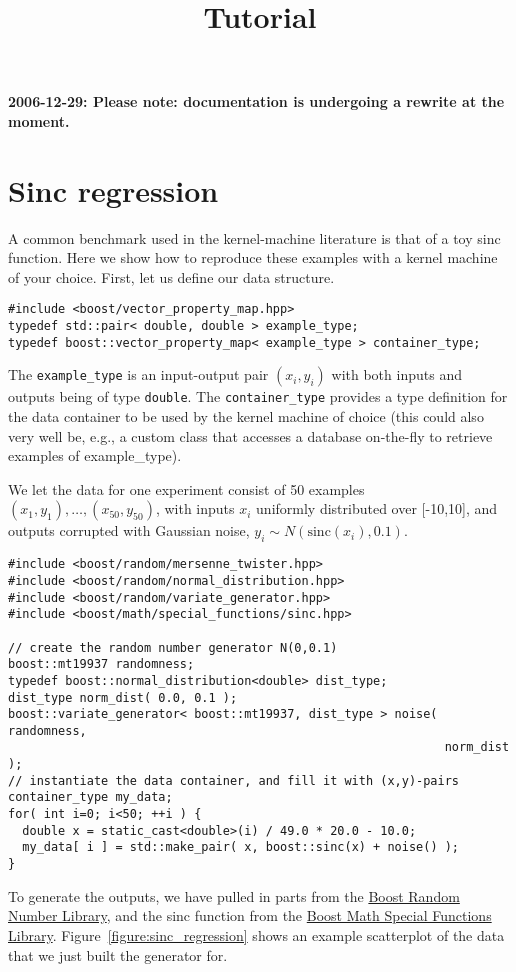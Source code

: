 \documentclass{article}
\begin{document}
\title{Tutorial}
\maketitle

\textbf{2006-12-29: Please note: documentation is undergoing a rewrite at the moment.}


\section*{Sinc regression}

A common benchmark used in the kernel-machine literature is that of a toy sinc function. 
Here we show how to reproduce these examples with a kernel machine of your choice. 
First, let us define our data structure.
%
\highlightcpp{}
\begin{verbatim}
#include <boost/vector_property_map.hpp>
typedef std::pair< double, double > example_type;
typedef boost::vector_property_map< example_type > container_type;
\end{verbatim}
%
The \texttt{example_type} is an input-output pair $(x_i,y_i)$ with both inputs and outputs being
of type \texttt{double}.
The \texttt{container_type} provides a type definition for the data container to
be used by the kernel machine of choice 
(this could also very well be, e.g., a custom class that 
accesses a database on-the-fly to retrieve examples of example_type).

We let the data for one experiment consist of 50 examples $(x_1,y_1),\ldots,(x_{50},y_{50})$,
with inputs $x_{i}$ uniformly distributed over [-10,10],
and outputs corrupted with Gaussian noise, $y_{i}\sim N(\mathrm{sinc}(x_{i}),0.1)$.
%
\highlightcpp{}
\begin{verbatim}
#include <boost/random/mersenne_twister.hpp>
#include <boost/random/normal_distribution.hpp>
#include <boost/random/variate_generator.hpp>
#include <boost/math/special_functions/sinc.hpp>

// create the random number generator N(0,0.1)
boost::mt19937 randomness;
typedef boost::normal_distribution<double> dist_type;
dist_type norm_dist( 0.0, 0.1 );
boost::variate_generator< boost::mt19937, dist_type > noise( randomness, 
                                                             norm_dist );
// instantiate the data container, and fill it with (x,y)-pairs
container_type my_data;
for( int i=0; i<50; ++i ) {
  double x = static_cast<double>(i) / 49.0 * 20.0 - 10.0;
  my_data[ i ] = std::make_pair( x, boost::sinc(x) + noise() );
}
\end{verbatim}
%
To generate the outputs, we have pulled in parts from the 
\href{http://www.boost.org/libs/random/index.html}{Boost Random Number Library}, and the
sinc function from the
\href{http://www.boost.org/libs/math/special_functions/index.html}{Boost Math Special Functions Library}. 
%
%
Figure~\ref{figure:sinc_regression} shows an example scatterplot of the data that we 
just built the generator for. 
\end{document}
